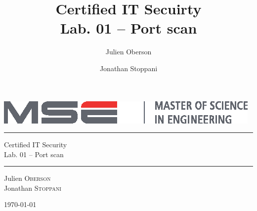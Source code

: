 \title{Certified IT Secuirty\\  Lab. 01 -- Port scan}
\author{Julien Oberson \and Jonathan Stoppani}

\begin{titlepage}
\thispagestyle{empty}

\vspace*{10mm}
\includegraphics{images/logo_mse}
\vspace{5mm}

\hrule
\vspace{0.2mm}
{\Large Certified IT Security}\\[2mm]
{\Huge Lab. 01 -- Port scan}\\[1mm]
\hrule

\begin{minipage}[t]{0.5\textwidth}
    \begin{flushleft}
        Julien \textsc{Oberson}\\
        Jonathan \textsc{Stoppani}
    \end{flushleft}
\end{minipage}
\begin{minipage}[t]{0.495\textwidth}
	\begin{flushright}
        \today
	\end{flushright}
\end{minipage}

\vfill

\tableofcontents

\end{titlepage}
